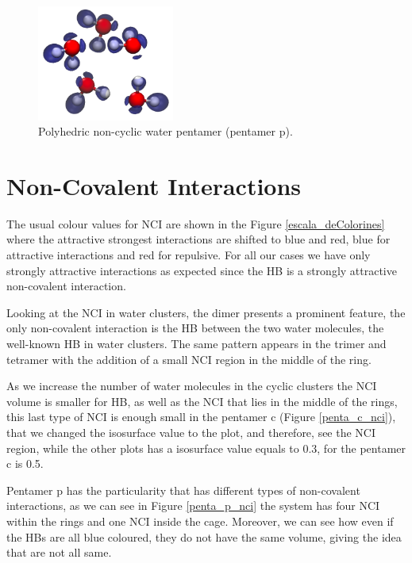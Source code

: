 \begin{figure}
  \centering
  \includegraphics[width=0.4\textwidth]{4/plots/elf/new/pentamer_pELF}
  \caption{Polyhedric non-cyclic water pentamer (pentamer p).}
\label{pentamer_p}
\end{figure}

\newpage

\section{Non-Covalent Interactions}

The usual colour values for NCI are shown in the Figure
\ref{escala_deColorines} where the attractive strongest interactions are
shifted to blue and red, blue for attractive interactions and red for
repulsive.  For all our cases we have only strongly attractive interactions as
expected since the HB is a strongly attractive non-covalent interaction.

Looking at the NCI in water clusters, the dimer presents a prominent feature,
the only non-covalent interaction is the HB between the two water molecules,
the well-known HB in water clusters. The same pattern appears in the trimer and
tetramer with the addition of a small NCI region in the middle of the ring.

As we increase the number of water molecules in the cyclic clusters the NCI
volume is smaller for HB, as well as the NCI that lies in the middle of the
rings, this last type of NCI is enough small in the pentamer c (Figure
\ref{penta_c_nci}), that we changed the isosurface value to the plot, and
therefore, see the NCI region, while the other plots has a isosurface value
equals to 0.3, for the pentamer c is 0.5.

Pentamer p has the particularity that has different types of non-covalent
interactions, as we can see in Figure \ref{penta_p_nci} the system has four NCI
within the rings and one NCI inside the cage. Moreover, we can see how even if
the HBs are all blue coloured, they do not have the same volume, giving the
idea that are not all same.


